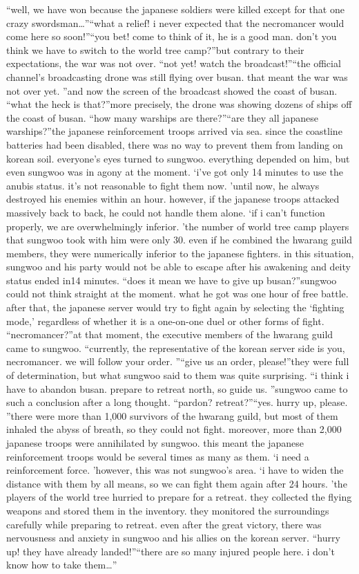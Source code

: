 “well, we have won because the japanese soldiers were killed except for that one crazy swordsman…”“what a relief! i never expected that the necromancer would come here so soon!”“you bet! come to think of it, he is a good man.
 don’t you think we have to switch to the world tree camp?”but contrary to their expectations, the war was not over.
“not yet! watch the broadcast!”“the official channel’s broadcasting drone was still flying over busan.
 that meant the war was not over yet.
”and now the screen of the broadcast showed the coast of busan.
“what the heck is that?”more precisely, the drone was showing dozens of ships off the coast of busan.
“how many warships are there?”“are they all japanese warships?”the japanese reinforcement troops arrived via sea.
 since the coastline batteries had been disabled, there was no way to prevent them from landing on korean soil.
everyone’s eyes turned to sungwoo.
 everything depended on him, but even sungwoo was in agony at the moment.
‘i’ve got only 14 minutes to use the anubis status.
 it’s not reasonable to fight them now.
’until now, he always destroyed his enemies within an hour.
 however, if the japanese troops attacked massively back to back, he could not handle them alone.
‘if i can’t function properly, we are overwhelmingly inferior.
’the number of world tree camp players that sungwoo took with him were only 30.
 even if he combined the hwarang guild members, they were numerically inferior to the japanese fighters.
in this situation, sungwoo and his party would not be able to escape after his awakening and deity status ended in14 minutes.
“does it mean we have to give up busan?”sungwoo could not think straight at the moment.
 what he got was one hour of free battle.
 after that, the japanese server would try to fight again by selecting the ‘fighting mode,’ regardless of whether it is a one-on-one duel or other forms of fight.
“necromancer?”at that moment, the executive members of the hwarang guild came to sungwoo.
“currently, the representative of the korean server side is you, necromancer.
 we will follow your order.
”“give us an order, please!”they were full of determination, but what sungwoo said to them was quite surprising.
“i think i have to abandon busan.
 prepare to retreat north, so guide us.
”sungwoo came to such a conclusion after a long thought.
“pardon? retreat?”“yes.
 hurry up, please.
”there were more than 1,000 survivors of the hwarang guild, but most of them inhaled the abyss of breath, so they could not fight.
moreover, more than 2,000 japanese troops were annihilated by sungwoo.
 this meant the japanese reinforcement troops would be several times as many as them.
‘i need a reinforcement force.
’however, this was not sungwoo’s area.
‘i have to widen the distance with them by all means, so we can fight them again after 24 hours.
’the players of the world tree hurried to prepare for a retreat.
 they collected the flying weapons and stored them in the inventory.
 they monitored the surroundings carefully while preparing to retreat.
even after the great victory, there was nervousness and anxiety in sungwoo and his allies on the korean server.
“hurry up! they have already landed!”“there are so many injured people here.
 i don’t know how to take them…”

